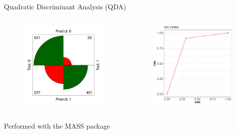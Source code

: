 \documentclass{beamer}
\begin{document}
\begin{frame}{Quadratic Discriminant Analysis (QDA)}
\begin{columns}
  \begin{figure}[b]{\textwidth}
    \includegraphics[width=\textwidth]{Pic/QDA_confusion.pdf}
  \end{figure} 
  \begin{figure}[b]{\textwidth}
    \includegraphics[width=\textwidth]{Pic/ROC_QDA.pdf}
  \end{figure}
\end{columns}
\begin{center}
Performed with the MASS package \cite{MASS}
\end{center}
\end{frame}
\end{document}
